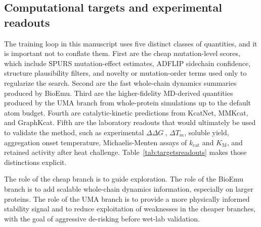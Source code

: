 \documentclass[11pt]{article}
\newcommand{\ddG}{\ensuremath{\Delta\Delta G \ }}
\newcommand{\kcat}{\ensuremath{k_{\mathrm{cat}}}}
\newcommand{\Km}{\ensuremath{K_{\mathrm M}}}
\begin{document}
	\subsection{Computational targets and experimental readouts}
	
	The training loop in this manuscript uses five distinct classes of quantities, and it is important not to conflate them. First are the cheap mutation-level scores, which include SPURS mutation-effect estimates, ADFLIP sidechain confidence, structure plausibility filters, and novelty or mutation-order terms used only to regularize the search. Second are the fast whole-chain dynamics summaries produced by BioEmu. Third are the higher-fidelity MD-derived quantities produced by the UMA branch from whole-protein simulations up to the default atom budget. Fourth are catalytic-kinetic predictions from KcatNet, MMKcat, and GraphKcat. Fifth are the laboratory readouts that would ultimately be used to validate the method, such as experimental \ddG, $\Delta T_m$, soluble yield, aggregation onset temperature, Michaelis-Menten assays of $\kcat$ and $\Km$, and retained activity after heat challenge. Table~\ref{tab:targetsreadouts} makes those distinctions explicit.
	
	The role of the cheap branch is to guide exploration. The role of the BioEmu branch is to add scalable whole-chain dynamics information, especially on larger proteins. The role of the UMA branch is to provide a more physically informed stability signal and to reduce exploitation of weaknesses in the cheaper branches, with the goal of aggressive de-risking before wet-lab validation. 
	
\end{document}
